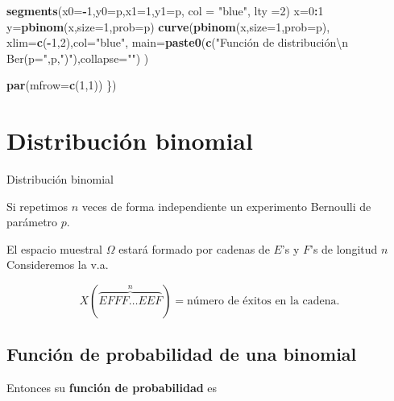 \documentclass[]{book}
\newenvironment{Shaded}{\begin{snugshade}}{\end{snugshade}}
\newcommand{\DataTypeTok}[1]{\textcolor[rgb]{0.13,0.29,0.53}{#1}}
\newcommand{\DecValTok}[1]{\textcolor[rgb]{0.00,0.00,0.81}{#1}}
\newcommand{\KeywordTok}[1]{\textcolor[rgb]{0.13,0.29,0.53}{\textbf{#1}}}
\newcommand{\NormalTok}[1]{#1}
\newcommand{\OperatorTok}[1]{\textcolor[rgb]{0.81,0.36,0.00}{\textbf{#1}}}
\newcommand{\StringTok}[1]{\textcolor[rgb]{0.31,0.60,0.02}{#1}}
\begin{document}
\begin{Shaded}
\begin{Highlighting}[]
\KeywordTok{segments}\NormalTok{(}\DataTypeTok{x0=}\OperatorTok{-}\DecValTok{1}\NormalTok{,}\DataTypeTok{y0=}\NormalTok{p,}\DataTypeTok{x1=}\DecValTok{1}\NormalTok{,}\DataTypeTok{y1=}\NormalTok{p, }\DataTypeTok{col =} \StringTok{"blue"}\NormalTok{, }\DataTypeTok{lty =}\DecValTok{2}\NormalTok{)}
\NormalTok{x=}\DecValTok{0}\OperatorTok{:}\DecValTok{1}
\NormalTok{y=}\KeywordTok{pbinom}\NormalTok{(x,}\DataTypeTok{size=}\DecValTok{1}\NormalTok{,}\DataTypeTok{prob=}\NormalTok{p)}
\KeywordTok{curve}\NormalTok{(}\KeywordTok{pbinom}\NormalTok{(x,}\DataTypeTok{size=}\DecValTok{1}\NormalTok{,}\DataTypeTok{prob=}\NormalTok{p),}
      \DataTypeTok{xlim=}\KeywordTok{c}\NormalTok{(}\OperatorTok{-}\DecValTok{1}\NormalTok{,}\DecValTok{2}\NormalTok{),}\DataTypeTok{col=}\StringTok{"blue"}\NormalTok{,}
      \DataTypeTok{main=}\KeywordTok{paste0}\NormalTok{(}\KeywordTok{c}\NormalTok{(}\StringTok{"Función de distribución\textbackslash{}n Ber(p="}\NormalTok{,p,}\StringTok{")"}\NormalTok{),}\DataTypeTok{collapse=}\StringTok{""}\NormalTok{)}
\NormalTok{      )}

\KeywordTok{par}\NormalTok{(}\DataTypeTok{mfrow=}\KeywordTok{c}\NormalTok{(}\DecValTok{1}\NormalTok{,}\DecValTok{1}\NormalTok{))}
\NormalTok{\})}
\end{Highlighting}
\end{Shaded}

\hypertarget{distribuciuxf3n-binomial}{%
\section{Distribución binomial}\label{distribuciuxf3n-binomial}}

 Distribución binomial

Si repetimos \(n\) veces de forma independiente un experimento Bernoulli de parámetro \(p\).

El espacio muestral \(\Omega\) estará formado por cadenas de \(E\)'s y \(F\)'s de longitud \(n\)
Consideremos la v.a.

\[X(\overbrace{EFFF\ldots EEF}^{n})=\mbox{número de éxitos en la cadena}.\]

\hypertarget{funciuxf3n-de-probabilidad-de-una-binomial}{%
\subsection{Función de probabilidad de una binomial}\label{funciuxf3n-de-probabilidad-de-una-binomial}}

Entonces su \textbf{función de probabilidad} es
\end{document}
